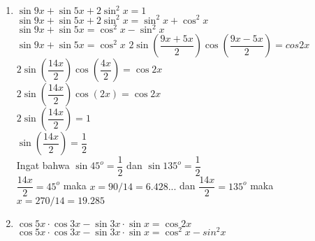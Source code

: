 \documentclass[10pt,a4paper]{article}
\author{Balya Rochmadi}
\begin{document}
\begin{enumerate}
	\item $\sin 9x + \sin 5x + 2\sin^2x=1$\\
		  $\sin 9x + \sin 5x + 2\sin^2x=\sin^2x+\cos^2x$\\
		  $\sin 9x + \sin 5x = \cos^2x-\sin^2x$\\
		  $\sin9x+\sin5x=\cos^2x$
		  $2\sin(\dfrac{9x+5x}{2})\cos(\dfrac{9x-5x}{2})=cos2x$\\
		  $2\sin(\dfrac{14x}{2})\cos(\dfrac{4x}{2})=\cos2x $\\
		  $2\sin(\dfrac{14x}{2})\cos(2x)=\cos2x $\\
		  $2\sin(\dfrac{14x}{2})=1$\\
		  $\sin(\dfrac{14x}{2})=\dfrac{1}{2}$\\
		  Ingat bahwa $\sin 45^o=\dfrac{1}{2}$ dan $\sin 135^o =\dfrac{1}{2}$ \\
		  $\dfrac{14x}{2}=45^o$ maka $x=90/14=6.428...$ dan $\dfrac{14x}{2}=135^o$ maka $x=270/14=19.285$
	\item $\cos5x\cdot\cos3x-\sin3x\cdot\sin x=\cos2x$\\
		  $\cos5x\cdot\cos3x-\sin3x\cdot\sin x=\cos^2x-sin^2x$
		  
\end{enumerate}
\end{document}
